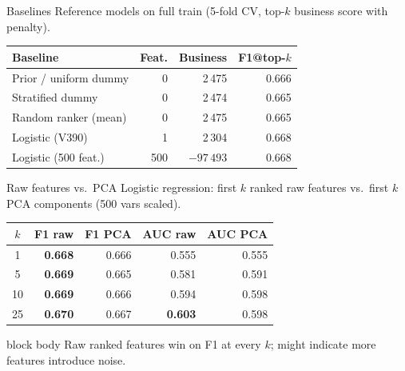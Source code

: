 \documentclass[aspectratio=169]{beamer}
\newcommand{\slidecomment}[1]{
    \vspace{0.3em}
    \begin{beamercolorbox}[wd=\linewidth,rounded=true,sep=0.7ex]{block body}
        \small #1
    \end{beamercolorbox}
}
\begin{document}
\begin{frame}{Baselines}
    Reference models on full train (5-fold CV, top-$k$ business score with penalty).

    \vspace{0.4em}
    \centering
    \footnotesize
    \begin{tabular}{lrrr}
        \toprule
        Baseline & Feat. & Business & F1@top-$k$ \\
        \midrule
        Prior / uniform dummy & 0 & 2\,475 & 0.666 \\
        Stratified dummy      & 0 & 2\,474 & 0.665 \\
        Random ranker (mean)  & 0 & 2\,475 & 0.665 \\
        Logistic (V390) & 1 & 2\,304 & 0.668 \\
        Logistic (500 feat.)  & 500 & $-97\,493$ & 0.668 \\
        \bottomrule
    \end{tabular}
\end{frame}

\begin{frame}{Raw features vs.\ PCA}
    Logistic regression: first $k$ ranked raw features vs.\ first $k$ PCA components (500 vars scaled).

    \vspace{0.4em}
    \centering
    \footnotesize
    \begin{tabular}{crrrr}
        \toprule
        $k$ & F1 raw & F1 PCA & AUC raw & AUC PCA \\
        \midrule
        1  & \textbf{0.668} & 0.666 & 0.555 & 0.555 \\
        5  & \textbf{0.669} & 0.665 & 0.581 & 0.591 \\
        10 & \textbf{0.669} & 0.666 & 0.594 & 0.598 \\
        25 & \textbf{0.670} & 0.667 & \textbf{0.603} & 0.598 \\
        \bottomrule
    \end{tabular}

    \vspace{0.5em}

    \slidecomment{Raw ranked features win on F1 at every $k$; might indicate more features introduce noise.}
\end{frame}
\end{document}
